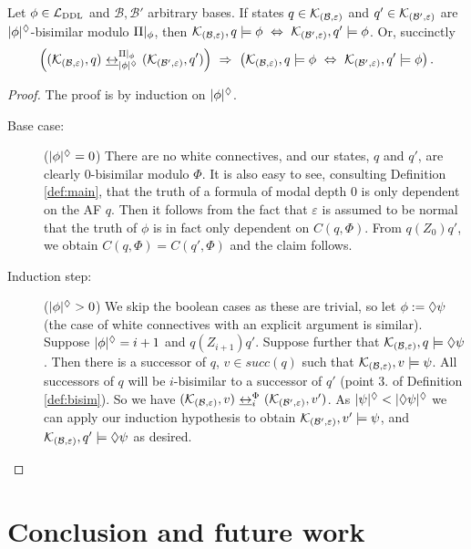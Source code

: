 \documentclass{llncs}
\newcommand{\dlangm}{{\mathcal L}_{\acro{DDL}}}
\newcommand{\kmod}[2]{{\cal K}_{(#1,#2)}}
\newcommand{\views}{\mathcal B}
\newcommand{\sem}{\varepsilon}
\newcommand{\depth}[1]{|{#1}|^\adia}
\newcommand{\bisim}{\underline{\leftrightarrow}}
\begin{document}
\begin{proposition} Let $\phi \in \dlangm$ and $\views, \views'$ arbitrary bases. If states $q \in \kmod \views \sem$ and $q' \in \kmod {\views'} \sem$ are $\depth{\phi}$-bisimilar modulo ${\Pi}|_{\phi}$, then $\kmod \views \sem, q \models \phi ~\Leftrightarrow~ \kmod {\views'} \sem , q' \models \phi$. Or, succinctly
$$ \left((\kmod \views \sem, q) ~\bisim_{\depth{\phi}}^{\restr \Pi \phi}~ (\kmod {\views'} \sem, q')\right) ~\Rightarrow~ \left(\kmod \views \sem, q \models \phi ~\Leftrightarrow~ \kmod {\views'} \sem, q' \models \phi\right).$$
\end{proposition}

\begin{proof} The proof is by induction on $\depth{\phi}$. 
\begin{description}
\item[Base case:] ($\depth{\phi} = 0$) There are no white connectives, and our states, $q$ and $q'$, are clearly 0-bisimilar modulo $\Phi$. It is also easy to see, consulting Definition \ref{def:main}, that the truth of a formula of modal depth $0$ is only dependent on the AF $q$. Then it follows from the fact that $\sem$ is assumed to be normal that the truth of $\phi$ is in fact only dependent on $C(q, \Phi)$. From $q (Z_0) q'$, we obtain $C(q, \Phi) = C(q', \Phi)$ and the claim follows. 
\item[Induction step:] ($\depth{\phi} > 0$) We skip the boolean cases as these are trivial, so let $\phi := \lozenge \psi$ (the case of white connectives with an explicit argument is similar). Suppose $\depth{\phi} = i + 1$ and $q (Z_{i+1}) q'$. Suppose further that $\kmod \views \sem, q \models \adia \psi$. Then there is a successor of $q$, $v \in succ(q)$ such that $\kmod \views \sem, v \models \psi$. All successors of $q$ will be $i$-bisimilar to a successor of $q'$ (point 3. of Definition \ref{def:bisim}). So we have $(\kmod \views \sem, v)~\bisim_i^{\Phi}~(\kmod {\views'} \sem, v')$. As $\depth{\psi} < \depth{\adia \psi}$ we can apply our induction hypothesis to obtain $\kmod {\views'} \sem, v' \models \psi$, and $\kmod {\views} \sem, q' \models \adia \psi$ as desired.
\end{description}

\end{proof}

\section{Conclusion and future work}\label{sec:concfut}
\end{document}
